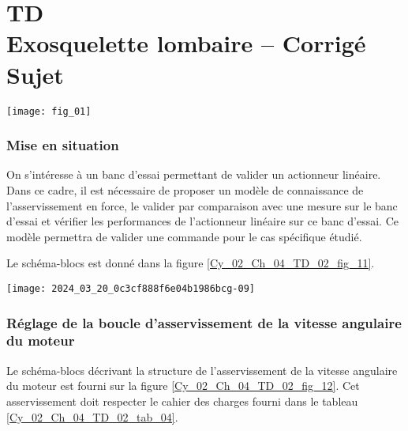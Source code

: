 \chapter*{TD  \\ 
Exosquelette lombaire -- 
\ifprof Corrigé \else Sujet \fi}

\iflivret {} \else
\ifprof  {} \else \fi
\fi

\setcounter{question}{0}

\begin{marginfigure}
\centering
\texttt{[image: fig\_01]}
\caption{Exosquelette lombaire Japet \label{Cy_02_Ch_04_TD_02_fig_01}}
\end{marginfigure}

\subsection*{Mise en situation}
On s'intéresse à un banc d'essai permettant de valider un actionneur linéaire. 
Dans ce cadre, il est nécessaire de proposer un modèle de connaissance de l’asservissement en force, le valider par comparaison avec une mesure sur le banc d’essai et vérifier les performances de l’actionneur linéaire sur ce banc d’essai. Ce modèle permettra de valider une commande pour le cas spécifique étudié.

Le schéma-blocs est donné dans la figure \ref{Cy_02_Ch_04_TD_02_fig_11}.

\begin{figure*}[!h]
\texttt{[image: 2024\_03\_20\_0c3cf888f6e04b1986bcg-09]}
\caption{ Schéma-blocs de l’asservissement de force
 développée par un actionneur linéaire placé sur le banc d’essai \label{Cy_02_Ch_04_TD_02_fig_11}}
\end{figure*}


\subsection*{Réglage de la boucle d'asservissement de la vitesse angulaire du moteur}
Le schéma-blocs décrivant la structure de l'asservissement de la vitesse angulaire du moteur est fourni sur la figure \ref{Cy_02_Ch_04_TD_02_fig_12}. Cet asservissement doit respecter le cahier des charges fourni dans le tableau \ref{Cy_02_Ch_04_TD_02_tab_04}.

